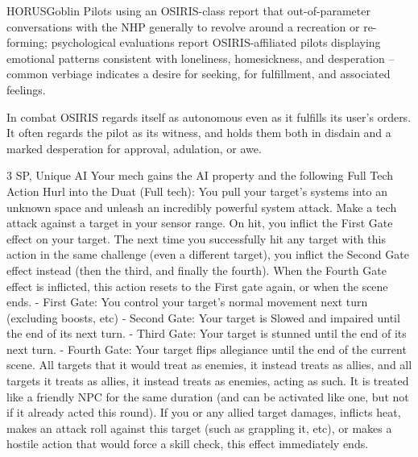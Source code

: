 \begin{mech}{HORUS}{Goblin}
Pilots using an OSIRIS-class report that out-of-parameter conversations with the NHP generally to revolve around a recreation or re-forming; psychological evaluations report OSIRIS-affiliated pilots displaying emotional patterns consistent with loneliness, homesickness, and desperation -- common verbiage indicates a desire for seeking, for fulfillment, and associated feelings.

In combat OSIRIS regards itself as autonomous even as it fulfills its user's orders. It often regards the pilot as its witness, and holds them both in disdain and a marked desperation for approval, adulation, or awe.


3 SP, Unique
AI
Your mech gains the AI property and the following Full Tech Action
Hurl into the Duat (Full tech): You pull your target's systems into an unknown space and unleash an incredibly powerful system attack. Make a tech attack against a target in your sensor range. On hit, you inflict the First Gate effect on your target. The next time you successfully hit any target with this action in the same challenge (even a different target), you inflict the Second Gate effect instead (then the third, and finally the fourth). When the Fourth Gate effect is inflicted, this action resets to the First gate again, or when the scene ends.
	- First Gate: You control your target's normal movement next turn (excluding boosts, etc)
	- Second Gate: Your target is Slowed and impaired until the end of its next turn.
	- Third Gate: Your target is stunned until the end of its next turn.
	- Fourth Gate: Your target flips allegiance until the end of the current scene. All targets that it would treat as enemies, it instead treats as allies, and all targets it treats as allies, it instead treats as enemies, acting as such. It is treated like a friendly NPC for the same duration (and can be activated like one, but not if it already acted this round). If you or any allied target damages, inflicts heat, makes an attack roll against this target (such as grappling it, etc), or makes a hostile action that would force a skill check, this effect immediately ends.


\end{mech}
